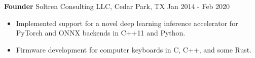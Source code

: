 \textbf{Founder}
Soltren Consulting LLC, Cedar Park, TX \hfill Jan 2014 - Feb 2020

\begin{itemize} \itemsep -2pt

\item Implemented support for a novel deep learning inference accelerator for PyTorch and ONNX backends in C++11
      and Python.

\item Firmware development for computer keyboards in C, C++, and some Rust.

\end{itemize}
